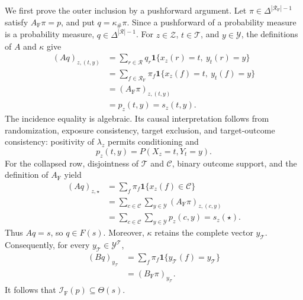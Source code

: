We first prove the outer inclusion by a pushforward argument.  Let \(\pi\in\Delta^{|\mathcal R_{\mathrm F}|-1}\) satisfy \(A_{\mathrm F}\pi=p\), and put \(q=\kappa_{\#}\pi\).  Since a pushforward of a probability measure is a probability measure, \(q\in\Delta^{|\mathcal R|-1}\).  For \(z\in\mathcal Z\), \(t\in\mathcal T\), and \(y\in\mathcal Y\), the definitions of \(A\) and \(\kappa\) give
\[
\begin{aligned}
(Aq)_{z,(t,y)}
&=\sum_{r\in\mathcal R}q_r
  \mathbf 1\{x_z(r)=t,\ y_t(r)=y\}\\
&=\sum_{f\in\mathcal R_{\mathrm F}}\pi_f
  \mathbf 1\{x_z(f)=t,\ y_t(f)=y\}\\
&=(A_{\mathrm F}\pi)_{z,(t,y)}\\
&=p_z(t,y)=s_z(t,y).
\end{aligned}
\]
The incidence equality is algebraic.  Its causal interpretation follows from randomization, exposure consistency, target exclusion, and target-outcome consistency: positivity of \(\lambda_z\) permits conditioning and
\[
p_z(t,y)=P(X_z=t,Y_t=y).
\]
For the collapsed row, disjointness of \(\mathcal T\) and \(\mathcal C\), binary outcome support, and the definition of \(A_{\mathrm F}\) yield
\[
\begin{aligned}
(Aq)_{z,\star}
&=\sum_f\pi_f\mathbf 1\{x_z(f)\in\mathcal C\}\\
&=\sum_{c\in\mathcal C}\sum_{y\in\mathcal Y}
  (A_{\mathrm F}\pi)_{z,(c,y)}\\
&=\sum_{c\in\mathcal C}\sum_{y\in\mathcal Y}p_z(c,y)
=s_z(\star).
\end{aligned}
\]
Thus \(Aq=s\), so \(q\in F(s)\).  Moreover, \(\kappa\) retains the complete vector \(y_{\mathcal T}\).  Consequently, for every \(y_{\mathcal T}\in\mathcal Y^{\mathcal T}\),
\[
\begin{aligned}
(Bq)_{y_{\mathcal T}}
&=\sum_f\pi_f\mathbf 1\{y_{\mathcal T}(f)=y_{\mathcal T}\}\\
&=(B_{\mathrm F}\pi)_{y_{\mathcal T}}.
\end{aligned}
\]
It follows that \(\mathcal I_{\mathrm F}(p)\subseteq\Theta(s)\).

